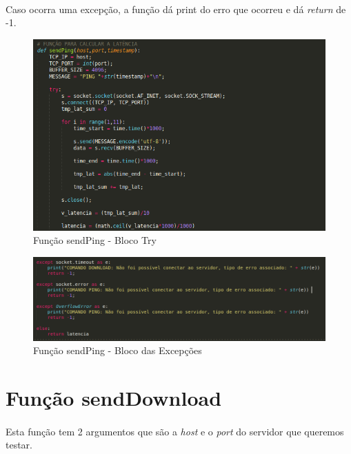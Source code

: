 \documentclass{report}
\begin{document}
\paragraph{}
Caso ocorra uma excepção, a função dá print do erro que ocorreu e dá \textit{return} de -1.



\begin{figure}[H]
\centering
\includegraphics[width=1.2\linewidth]{sendPing1.png}
\caption{Função sendPing - Bloco Try}
\label{gePing}
\end{figure}



\begin{figure}[H]
\centering
\includegraphics[width=1.2\linewidth]{sendPing2.png}
\caption{Função sendPing - Bloco das Excepções}
\label{gePing1}
\end{figure}


\newpage



\section{Função sendDownload }
\label{sec:sendDownload}
\paragraph{}
Esta função tem 2 argumentos que são a \textit{host} e o \textit{port} do servidor que queremos testar.
\end{document}
